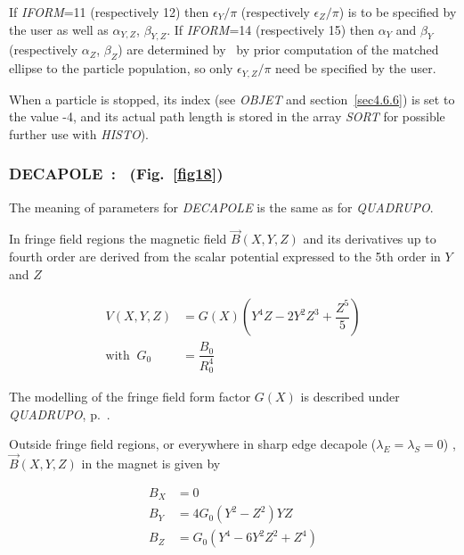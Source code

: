 {\noindent If \textsl{IFORM}=11 (respectively 12) then $\epsilon_Y/\pi$  (respectively $\epsilon_Z/\pi$) 
is to be specified by the user as well as $\alpha_{Y,Z}$, $\beta_{Y,Z}$. 
If \textsl{IFORM}=14 (respectively 15) then $\alpha_Y$ and  $\beta_Y$  (respectively $\alpha_Z$,  $\beta_Z$) 
are  determined by \zgoubi\ by prior computation of the 
matched ellipse to the particle population, so only $\epsilon_{Y,Z}/\pi$ need be specified by the user. 




\bigskip

\noindent When a particle is stopped, its index \IEX{} (see \textsl{OBJET}
and section~\ref{sec4.6.6}) is set to the value -4, and its actual path length is stored in 
the array \textsl{SORT}  for possible further use with \textsl{HISTO}). 


\newpage

\subsubsection*{DECAPOLE~:  \DECAPOLETitl\ (Fig.~\protect\ref{fig18})} \label{DECAPOLE} 
\medskip

The meaning of parameters for \textsl{DECAPOLE}  is the same as for \textsl{QUADRUPO}.  

\noindent In fringe field regions the magnetic field $ \vec  B(X,Y,Z) $ and
its derivatives up to fourth order are derived from the scalar potential expressed to 
the 5th order in $ Y $ and $ Z $ 

\begin{align*}
	V(X,Y,Z) &   =    G(X) \left(Y^4Z-2Y^2Z^3+ \dfrac{Z^5 }{ 5}\right)  \\
	\text{with  } ~ G_0 &   = \dfrac{ B_0 }{ R^4_0} 
\end{align*}

\noindent The  modelling of the fringe field form factor  $G(X)$
 is described under \textsl{QUADRUPO}, p.~\pageref{QUADRUPO}. 

\bigskip

\noindent Outside fringe field regions, or everywhere in sharp edge decapole 
($ \lambda_ E=\lambda_ S=0$) , $ \vec  B(X,Y,Z) $ in the magnet is given by 

\begin{align*}
	B_X &   =    0 \\
	B_Y &   =   4G_0(Y^2-Z^2)YZ \\
	B_Z &   =    G_0(Y^4-6Y^2Z^2+Z^4)
\end{align*}
\vfill

}
